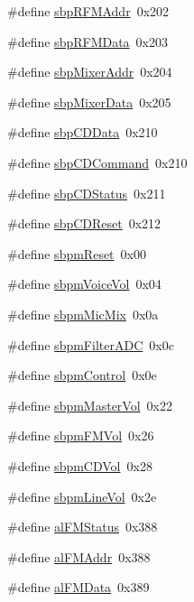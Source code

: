 \begin{DoxyCompactItemize}
\#define \hyperlink{ID__SD_8H_a134ba6f8e7ad355fb6f031ff0a9a2912}{sbpRFMAddr}~0x202
\item 
\#define \hyperlink{ID__SD_8H_a5d73fcc579b5ca4c70fc3106f5fa4f41}{sbpRFMData}~0x203
\item 
\#define \hyperlink{ID__SD_8H_af3ee81e32129f2a64ccfa17d802329d6}{sbpMixerAddr}~0x204
\item 
\#define \hyperlink{ID__SD_8H_a72cb8ab797724928b77e969ede464739}{sbpMixerData}~0x205
\item 
\#define \hyperlink{ID__SD_8H_a3a690122c2b8bf644ede007e2fbaa26e}{sbpCDData}~0x210
\item 
\#define \hyperlink{ID__SD_8H_a24fe8a14986ec313bf32fdba17b0bcfe}{sbpCDCommand}~0x210
\item 
\#define \hyperlink{ID__SD_8H_a2ac210b7b732e95a80066bffc3502ce5}{sbpCDStatus}~0x211
\item 
\#define \hyperlink{ID__SD_8H_a0dc73f2b8553641016f11b04829695ee}{sbpCDReset}~0x212
\item 
\#define \hyperlink{ID__SD_8H_a1d3e21d107905d41be5285de8d619fde}{sbpmReset}~0x00
\item 
\#define \hyperlink{ID__SD_8H_a7f14de74e34931c73d1ca9b19b669ca3}{sbpmVoiceVol}~0x04
\item 
\#define \hyperlink{ID__SD_8H_a294c8f309b6ba5a36a2cf3ba0f7d21ea}{sbpmMicMix}~0x0a
\item 
\#define \hyperlink{ID__SD_8H_a2375218d588250de90f3f938c89d2cb5}{sbpmFilterADC}~0x0c
\item 
\#define \hyperlink{ID__SD_8H_ab55efed2980d8c285af3a010e19791fd}{sbpmControl}~0x0e
\item 
\#define \hyperlink{ID__SD_8H_a5091ed97284618dea15c906a146c1c88}{sbpmMasterVol}~0x22
\item 
\#define \hyperlink{ID__SD_8H_a40006ed2581461c3be963d27dfd56940}{sbpmFMVol}~0x26
\item 
\#define \hyperlink{ID__SD_8H_ab0e645be7159792e8ce0a1706a4b2619}{sbpmCDVol}~0x28
\item 
\#define \hyperlink{ID__SD_8H_a978793ab177ee1345bb5b3f4800417d9}{sbpmLineVol}~0x2e
\item 
\#define \hyperlink{ID__SD_8H_a78167dccc8f90e545691885a09579071}{alFMStatus}~0x388
\item 
\#define \hyperlink{ID__SD_8H_a7354a8e8690f7722b4d0d4c20a25c866}{alFMAddr}~0x388
\item 
\#define \hyperlink{ID__SD_8H_ab7f038f141d7787833ea44c21722d76f}{alFMData}~0x389
\item 

\end{DoxyCompactItemize}
